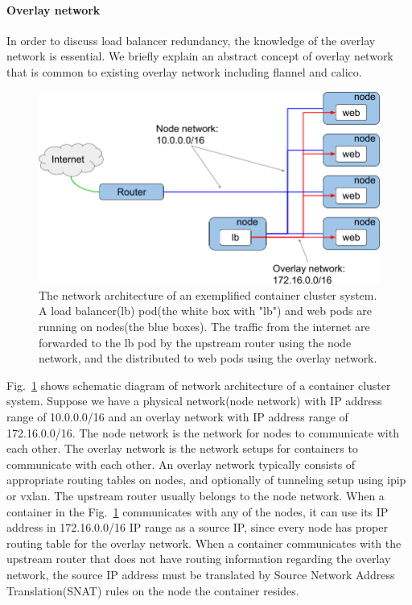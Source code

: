 \paragraph{\bf Overlay network}\label{Overlay network}

In order to discuss load balancer redundancy, the knowledge of the overlay network is essential.
We briefly explain an abstract concept of overlay network that is common to existing overlay network including flannel\cite{coreos_2018} and calico\cite{project_calico}.

\begin{figure}[tb]
\begin{center}
\includegraphics[width=\columnwidth]{Figs/overlay.png}
\end{center}
\caption{
  The network architecture of an exemplified container cluster system. \\ %
  A load balancer(lb) pod(the white box with "lb") and web pods are running on nodes(the blue boxes).
  The traffic from the internet are forwarded to the lb pod by the upstream router using the node network,
  and the distributed to web pods using the overlay network.
}
\label{fig:overlay}
\end{figure}

Fig.~\ref{fig:overlay} shows schematic diagram of network architecture of a container cluster system. 
Suppose we have a physical network(node network) with IP address range of 10.0.0.0/16 and an overlay network with IP address range of 172.16.0.0/16.
The node network is the network for nodes to communicate with each other.
The overlay network is the network setups for containers to communicate with each other.
An overlay network typically consists of appropriate routing tables on nodes, and optionally of tunneling setup using ipip or vxlan.
The upstream router usually belongs to the node network.
When a container in the Fig.~\ref{fig:overlay} communicates with any of the nodes, it can use its IP address in 172.16.0.0/16 IP range as a source IP, since every node has proper routing table for the overlay network.
When a container communicates with the upstream router that does not have routing information regarding the overlay network, the source IP address must be translated by Source Network Address Translation(SNAT) rules on the node the container resides.

